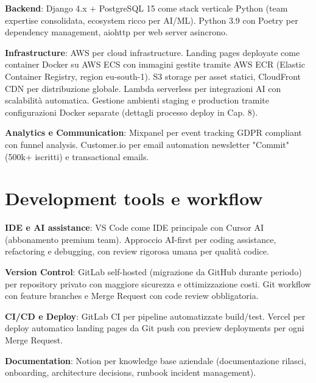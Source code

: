 \textbf{Backend}: Django 4.x + PostgreSQL 15 come stack verticale Python (team expertise consolidata, ecosystem ricco per AI/ML). Python 3.9 con Poetry per dependency management, aiohttp per web server asincrono.

\textbf{Infrastructure}: AWS per cloud infrastructure. Landing pages deployate come container Docker su AWS ECS con immagini gestite tramite AWS ECR (Elastic Container Registry, region eu-south-1). S3 storage per asset statici, CloudFront CDN per distribuzione globale. Lambda serverless per integrazioni AI con scalabilità automatica. Gestione ambienti staging e production tramite configurazioni Docker separate (dettagli processo deploy in Cap. 8).

\textbf{Analytics e Communication}: Mixpanel per event tracking GDPR compliant con funnel analysis. Customer.io per email automation newsletter "Commit" (500k+ iscritti) e transactional emails.

\section{Development tools e workflow}

\textbf{IDE e AI assistance}: VS Code come IDE principale con Cursor AI (abbonamento premium team). Approccio AI-first per coding assistance, refactoring e debugging, con review rigorosa umana per qualità codice.

\textbf{Version Control}: GitLab self-hosted (migrazione da GitHub durante periodo) per repository privato con maggiore sicurezza e ottimizzazione costi. Git workflow con feature branches e Merge Request con code review obbligatoria.

\textbf{CI/CD e Deploy}: GitLab CI per pipeline automatizzate build/test. Vercel per deploy automatico landing pages da Git push con preview deployments per ogni Merge Request.

\textbf{Documentation}: Notion per knowledge base aziendale (documentazione rilasci, onboarding, architecture decisions, runbook incident management).